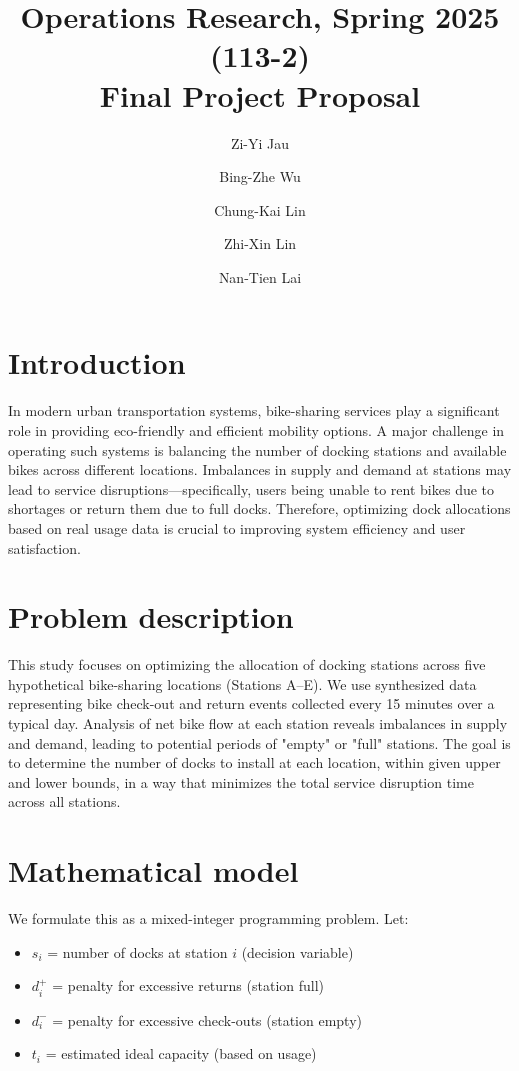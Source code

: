 \documentclass[11pt,a4paper]{article}
\title{Operations Research, Spring 2025 (113-2) \\ Final Project Proposal}
\author{Zi-Yi Jau} %
\author{Bing-Zhe Wu} %
\author{Chung-Kai Lin} %
\author{Zhi-Xin Lin} %
\author{Nan-Tien Lai} %
\affil{Department of Information Management, National Taiwan University}
\begin{document}
\maketitle

\section{Introduction}
In modern urban transportation systems, bike-sharing services play a significant role in providing eco-friendly and efficient mobility options. A major challenge in operating such systems is balancing the number of docking stations and available bikes across different locations. Imbalances in supply and demand at stations may lead to service disruptions—specifically, users being unable to rent bikes due to shortages or return them due to full docks. Therefore, optimizing dock allocations based on real usage data is crucial to improving system efficiency and user satisfaction.

\section{Problem description}
This study focuses on optimizing the allocation of docking stations across five hypothetical bike-sharing locations (Stations A–E). We use synthesized data representing bike check-out and return events collected every 15 minutes over a typical day. Analysis of net bike flow at each station reveals imbalances in supply and demand, leading to potential periods of "empty" or "full" stations. The goal is to determine the number of docks to install at each location, within given upper and lower bounds, in a way that minimizes the total service disruption time across all stations.

\section{Mathematical model}
We formulate this as a mixed-integer programming problem. Let:
\begin{itemize}
    \item $s_i$ = number of docks at station $i$ (decision variable)
    \item $d_i^+$ = penalty for excessive returns (station full)
    \item $d_i^-$ = penalty for excessive check-outs (station empty)
    \item $t_i$ = estimated ideal capacity (based on usage)
\end{itemize}
\end{document}
